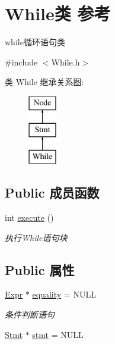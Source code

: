 \hypertarget{class_while}{}\section{While类 参考}
\label{class_while}


while循环语句类  




{\ttfamily \#include $<$While.\+h$>$}

类 While 继承关系图\+:\begin{figure}[H]
\begin{center}
\leavevmode
\includegraphics[height=3.000000cm]{class_while}
\end{center}
\end{figure}
\subsection*{Public 成员函数}
\begin{DoxyCompactItemize}
\item 
int \hyperlink{class_while_a23b58565983130bb54577f4399ffd822}{execute} ()\hypertarget{class_while_a23b58565983130bb54577f4399ffd822}{}\label{class_while_a23b58565983130bb54577f4399ffd822}

\begin{DoxyCompactList}\small\item\em 执行\+While语句块 \end{DoxyCompactList}\end{DoxyCompactItemize}
\subsection*{Public 属性}
\begin{DoxyCompactItemize}
\item 
\hyperlink{class_expr}{Expr} $\ast$ \hyperlink{class_while_a14af77714254099c0cc465944ef67dd3}{equality} = N\+U\+LL\hypertarget{class_while_a14af77714254099c0cc465944ef67dd3}{}\label{class_while_a14af77714254099c0cc465944ef67dd3}

\begin{DoxyCompactList}\small\item\em 条件判断语句 \end{DoxyCompactList}\item 
\hyperlink{class_stmt}{Stmt} $\ast$ \hyperlink{class_while_a97dfbf50f27b969c5b765ecfb1ef4ac2}{stmt} = N\+U\+LL
\end{DoxyCompactItemize}
